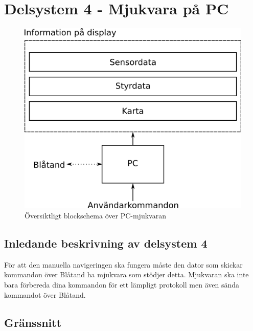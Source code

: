 \documentclass[a4paper,11pt]{article}
\begin{document}
\section{Delsystem 4 - Mjukvara på PC}
\begin{figure}[h!]
    \centering
    \includegraphics[scale=1]{PC.png} 
    \caption{Översiktligt blockschema över PC-mjukvaran}
\end{figure}

\subsection{Inledande beskrivning av delsystem 4}
För att den manuella navigeringen ska fungera måste den dator som skickar kommandon över Blåtand ha mjukvara som stödjer detta. Mjukvaran ska inte bara förbereda dina kommandon för ett lämpligt protokoll men även sända kommandot över Blåtand. 

\subsection{Gränssnitt}
\begin{LIPSkravlista}
\end{LIPSkravlista}
\end{document}
